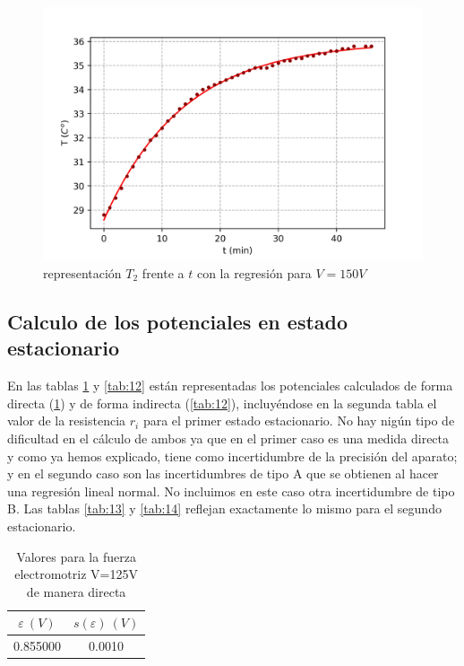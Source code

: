 \documentclass[12pt,a4paper]{article}
\begin{document}
\begin{figure}[h!] \centering
\includegraphics[scale=0.9]{T2.png}
\caption{representación $T_2$ frente a $t$ con la regresión para $V=150V$}
\end{figure}



\newpage

\subsection{Calculo de los potenciales en estado estacionario}




En las tablas \ref{tab:11} y \ref{tab:12} están representadas los potenciales calculados de forma directa (\ref{tab:11}) y de forma indirecta (\ref{tab:12}), incluyéndose en la segunda tabla el valor de la resistencia $r_i$ para el primer estado estacionario. No hay nigún tipo de dificultad en el cálculo de ambos ya que en el primer caso es una medida directa y como ya hemos explicado, tiene como incertidumbre de la precisión del aparato; y en el segundo caso son las incertidumbres de tipo A que se obtienen al hacer una regresión lineal normal. No incluimos en este caso otra incertidumbre de tipo B.  Las tablas  \ref{tab:13} y \ref{tab:14} reflejan exactamente lo mismo para el segundo estacionario.



\begin{table}[h!] 	 \centering 
\begin{tabular}{|c|c|} 
\hline 
$\varepsilon \ (V)$ & $s(\varepsilon) \ (V) $ \\ \hline 
0.855000  & 0.0010 \\ 
\hline
\end{tabular} 
\caption{Valores para la fuerza electromotriz V=125V de manera directa} 
\label{tab:11} 
\end{table} 
\end{document}

